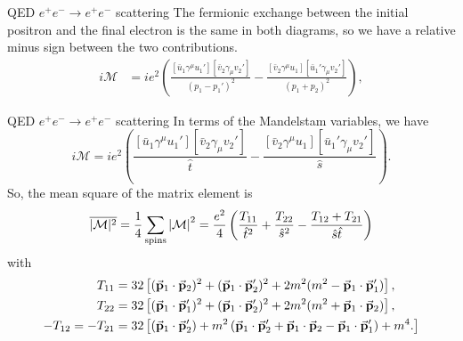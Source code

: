 \documentclass{../bredelebeamer}
\begin{document}
\begin{frame}{QED $e^+e^- \longrightarrow e^+e^-$ scattering}
    The fermionic exchange between the initial positron and the final electron is the same in both diagrams, so we have a relative minus sign between the two contributions.
    \begin{align}
        i\mathcal{M} & = ie^2 \left(
        \frac{
                \left[\bar u_1 \gamma^\mu u_1'\right]\left[\bar v_2 \gamma_\mu v_2'\right]
            }{(p_1 - p_1')^2}
        -
        \frac{
                \left[\bar v_2 \gamma^\mu u_1\right]\left[\bar u_1' \gamma_\mu v_2'\right]
            }{(p_1 + p_2)^2}
        \right),
    \end{align}
\end{frame}
\begin{frame}{QED $e^+e^- \longrightarrow e^+e^-$ scattering}
    In terms of the Mandelstam variables, we have
    \begin{equation}
        i \mathcal{M}
        = ie^2 \left(
        \frac{
            \left[\bar u_1 \gamma^\mu u_1'\right]\left[\bar v_2 \gamma_\mu v_2'\right]
        }{\hat t}
        -
        \frac{
            \left[\bar v_2 \gamma^\mu u_1\right]\left[\bar u_1' \gamma_\mu v_2'\right]
        }{\hat s}
        \right).
    \end{equation}
    So, the mean square of the matrix element is
    \begin{equation}
        \overline{|\mathcal{M}|^2} =\frac{1}{4}\sum_{\text{spins}} \abs{\mathcal M}^2= \frac{e^2}{4} \left(
        \frac{T_{11}}{\hat t^2}
        + \frac{T_{22}}{\hat s^2}
        - \frac{T_{12}+T_{21}}{\hat s\hat t}
        \right)
    \end{equation}
    with
    \begin{align}
        T_{11}            & = 32\left[ (\va{p}_1\cdot \va{p}_2)^2 + (\va{p}_1\cdot \va{p}_2')^2 + 2m^2(m^2 - \va{p}_1\cdot \va{p}_1') \right],
        \\
        T_{22}            & = 32\left[ (\va{p}_1\cdot \va{p}_1')^2 + (\va{p}_1\cdot \va{p}_2')^2 + 2m^2(m^2 + \va{p}_1\cdot \va{p}_2) \right],
        \\
        -T_{12} = -T_{21} & = 32 \left[
            (\va{p}_1\cdot \va{p}_2') +m^2\left(
            \va{p}_1\cdot \va{p}_2' + \va{p}_1\cdot \va{p}_2 - \va{p}_1\cdot \va{p}_1'
            \right)
            +m^4.
            \right]
    \end{align}
\end{frame}
\end{document}
